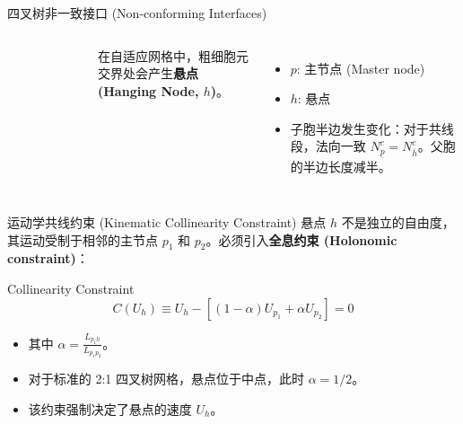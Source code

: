 \documentclass{beamer}
\begin{document}
	\begin{frame}{四叉树非一致接口 (Non-conforming Interfaces)}
		\begin{columns}
			\begin{figure}[htpb]
				\centering
				\fbox{\begin{minipage}[c][4cm][c]{\linewidth}
						\centering
						\textcolor{gray}{[图片占位] 图 2: \\ Quadtree 非一致接口}
				\end{minipage}}
			\end{figure}
			
			在自适应网格中，粗细胞元交界处会产生\textbf{悬点 (Hanging Node, $h$)}。
			\vspace{0.2cm}
			\begin{itemize}
				\item $p$: 主节点 (Master node)
				\item $h$: 悬点
				\item 子胞半边发生变化：对于共线段，法向一致 $N_{\underline{p}}^c = N_{\overline{h}}^c$。父胞的半边长度减半。
			\end{itemize}
		\end{columns}
	\end{frame}
	
	\begin{frame}{运动学共线约束 (Kinematic Collinearity Constraint)}
		悬点 $h$ 不是独立的自由度，其运动受制于相邻的主节点 $p_1$ 和 $p_2$。必须引入\textbf{全息约束 (Holonomic constraint)}：
		
		\begin{block}{Collinearity Constraint}
			\begin{equation*}
				C(U_h) \equiv U_h - [(1-\alpha)U_{p_1} + \alpha U_{p_2}] = 0
			\end{equation*}
		\end{block}
		
		\begin{itemize}
			\item 其中 $\alpha = \frac{L_{p_1 h}}{L_{p_1 p_2}}$。
			\item 对于标准的 2:1 四叉树网格，悬点位于中点，此时 $\alpha = 1/2$。
			\item 该约束强制决定了悬点的速度 $U_h$。
		\end{itemize}
	\end{frame}
	
\end{document}
